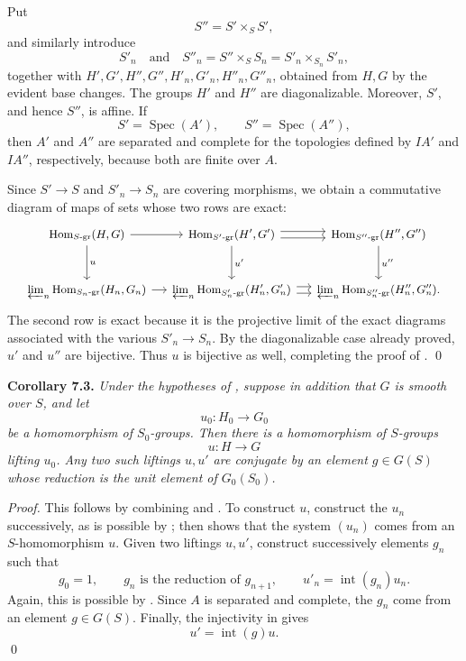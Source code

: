 Put
\[
  S''=S'\times_SS',
\]
and similarly introduce
\[
  S'_n
  \quad\text{and}\quad
  S''_n
  =S''\times_SS_n
  =S'_n\times_{S_n}S'_n,
\]
together with \(H',G',H'',G'',H'_n,G'_n,H''_n,G''_n\), obtained from
\(H,G\) by the evident base changes. The groups \(H'\) and \(H''\) are
diagonalizable. Moreover, \(S'\), and hence \(S''\), is affine. If
\[
  S'=\operatorname{Spec}(A'),
  \qquad
  S''=\operatorname{Spec}(A''),
\]
then \(A'\) and \(A''\) are separated and complete for the topologies
defined by \(IA'\) and \(IA''\), respectively, because both are finite
over \(A\).

Since \(S'\to S\) and \(S'_n\to S_n\) are covering morphisms, we obtain
a commutative diagram of maps of sets whose two rows are exact:
\[
\begin{tikzcd}[
  column sep=small,
  row sep=large,
  cells={nodes={font=\small}}
]
  \operatorname{Hom}_{S\text{-}\mathrm{gr}}(H,G)
    \arrow[r]
    \arrow[d,"u"]
  & \operatorname{Hom}_{S'\text{-}\mathrm{gr}}(H',G')
    \arrow[r,shift left=.6ex]
    \arrow[r,shift right=.6ex]
    \arrow[d,"u'"]
  & \operatorname{Hom}_{S''\text{-}\mathrm{gr}}(H'',G'')
    \arrow[d,"u''"]
  \\
  \varprojlim_n
    \operatorname{Hom}_{S_n\text{-}\mathrm{gr}}(H_n,G_n)
    \arrow[r]
  & \varprojlim_n
    \operatorname{Hom}_{S'_n\text{-}\mathrm{gr}}(H'_n,G'_n)
    \arrow[r,shift left=.6ex]
    \arrow[r,shift right=.6ex]
  & \varprojlim_n
    \operatorname{Hom}_{S''_n\text{-}\mathrm{gr}}(H''_n,G''_n).
\end{tikzcd}
\]
The second row is exact because it is the projective limit of the exact
diagrams associated with the various \(S'_n\to S_n\). By the
diagonalizable case already proved, \(u'\) and \(u''\) are bijective.
Thus \(u\) is bijective as well, completing the proof of
. \qed

\medskip
\noindent{}\textbf{Corollary 7.3.}
\textit{Under the hypotheses of
, suppose in addition that \(G\)
is smooth over \(S\), and let
\[
  u_0:H_0\longrightarrow G_0
\]
be a homomorphism of \(S_0\)-groups. Then there is a homomorphism of
\(S\)-groups
\[
  u:H\longrightarrow G
\]
lifting \(u_0\). Any two such liftings \(u,u'\) are conjugate by an
element \(g\in G(S)\) whose reduction is the unit element of
\(G_0(S_0)\).}

\emph{Proof.}
This follows by combining
 and
. To construct \(u\), construct
the \(u_n\) successively, as is possible by ;  then shows
that the system \((u_n)\) comes from an \(S\)-homomorphism \(u\). Given
two liftings \(u,u'\), construct successively elements \(g_n\) such
that
\[
  g_0=1,
  \qquad
  g_n\text{ is the reduction of }g_{n+1},
  \qquad
  u'_n=\operatorname{int}(g_n)u_n.
\]
Again, this is possible by . Since \(A\) is separated and complete,
the \(g_n\) come from an element \(g\in G(S)\). Finally, the injectivity
in  gives
\[
  u'=\operatorname{int}(g)u.
\]
\qed

